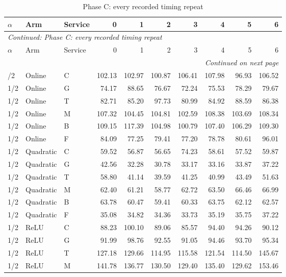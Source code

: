 \begingroup\footnotesize\setlength{\tabcolsep}{3pt}
\begin{longtable}{lllrrrrrrr}
\caption{Phase C: every recorded timing repeat}\label{tab:allclocks119c}\\
\toprule
$\alpha$ & Arm & Service & 0 & 1 & 2 & 3 & 4 & 5 & 6\\\midrule
\endfirsthead
\multicolumn{10}{l}{\textit{Continued: Phase C: every recorded timing repeat}}\\
\toprule
$\alpha$ & Arm & Service & 0 & 1 & 2 & 3 & 4 & 5 & 6\\\midrule
\endhead
\midrule\multicolumn{10}{r}{\textit{Continued on next page}}\\
\endfoot
\bottomrule
\endlastfoot
1/2 & Online & C & 102.13 & 102.97 & 100.87 & 106.41 & 107.98 & 96.93 & 106.52 \\
1/2 & Online & G & 74.17 & 88.65 & 76.67 & 72.24 & 75.53 & 78.29 & 79.67 \\
1/2 & Online & T & 82.71 & 85.20 & 97.73 & 80.99 & 84.92 & 88.59 & 86.38 \\
1/2 & Online & M & 107.32 & 104.45 & 104.81 & 102.59 & 108.38 & 103.69 & 108.34 \\
1/2 & Online & B & 109.15 & 117.39 & 104.98 & 100.79 & 107.40 & 106.29 & 109.30 \\
1/2 & Online & F & 84.09 & 77.25 & 79.41 & 77.20 & 78.78 & 80.61 & 96.01 \\
1/2 & Quadratic & C & 59.52 & 56.87 & 56.65 & 74.23 & 58.61 & 57.52 & 59.87 \\
1/2 & Quadratic & G & 42.56 & 32.28 & 30.78 & 33.17 & 33.16 & 33.87 & 37.22 \\
1/2 & Quadratic & T & 58.80 & 41.14 & 39.59 & 41.25 & 40.99 & 43.49 & 51.63 \\
1/2 & Quadratic & M & 62.40 & 61.21 & 58.77 & 62.72 & 63.50 & 66.46 & 66.99 \\
1/2 & Quadratic & B & 63.78 & 60.47 & 59.41 & 60.33 & 63.75 & 62.12 & 62.57 \\
1/2 & Quadratic & F & 35.08 & 34.82 & 34.36 & 33.73 & 35.19 & 35.75 & 37.22 \\
1/2 & ReLU & C & 88.23 & 100.10 & 89.06 & 85.57 & 94.40 & 94.26 & 90.12 \\
1/2 & ReLU & G & 91.99 & 98.76 & 92.55 & 91.05 & 94.46 & 93.70 & 95.34 \\
1/2 & ReLU & T & 127.18 & 129.66 & 114.95 & 115.58 & 121.54 & 114.50 & 145.67 \\
1/2 & ReLU & M & 141.78 & 136.77 & 130.50 & 129.40 & 135.40 & 129.62 & 153.46 \\

\end{longtable}
